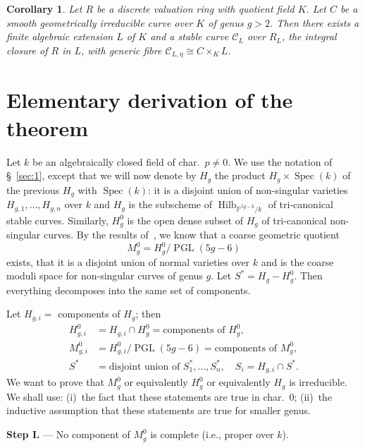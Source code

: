 \documentclass[10pt]{amsart}
\theoremstyle{plain}
\newtheorem{corollary}[theorem]{Corollary}
\theoremstyle{definition}
\DeclareMathOperator{\Spec}{Spec}
\DeclareMathOperator{\PGL}{PGL}
\DeclareMathOperator{\Hilb}{Hilb}
\begin{document}
\begin{corollary}\label{cor:2.7}
Let $R$ be a discrete valuation ring with quotient field $K$. Let $C$ be a smooth geometrically irreducible curve over $K$ of genus $g > 2$. Then there exists a finite algebraic extension $L$ of $K$ and a stable curve $\mathscr{C}_L$ over $R_L$, the integral closure of $R$ in $L$, with generic fibre $\mathscr{C}_{L,\eta} \cong C \times_K L$.
\end{corollary}

\section{Elementary derivation of the theorem}\label{sec:3}

Let $k$ be an algebraically closed field of char.~$p \neq 0$. We use the notation of \S~\ref{sec:1}, except that we will now denote by $H_g$ the product $H_g \times \Spec(k)$ of the previous $H_g$ with $\Spec(k)$: it is a disjoint union of non-singular varieties $H_{g,1}, \ldots, H_{g,n}$ over $k$ and $H_g$ is the subscheme of $\Hilb_{\mathbb{P}^{5g-6}/k}$ of tri-canonical stable curves. Similarly, $H_g^0$ is the open dense subset of $H_g$ of tri-canonical non-singular curves. By the results of~\cite{M1}, we know that a coarse geometric quotient
\[
M_g^0 = H_g^0/\PGL(5g-6)
\]
exists, that it is a disjoint union of normal varieties over $k$ and is the coarse moduli space for non-singular curves of genus $g$. Let $S^* = H_g - H_g^0$. Then everything decomposes into the same set of components.

Let $H_{g,i} =$ components of $H_g$; then
\begin{align*}
H_{g,i}^0 &= H_{g,i} \cap H_g^0 = \text{components of } H_g^0, \\
M_{g,i}^0 &= H_{g,i}^0 / \PGL(5g-6) = \text{components of } M_g^0, \\
S^* &= \text{disjoint union of } S_1^*, \ldots, S_n^*, \quad S_i = H_{g,i} \cap S^*.
\end{align*}
We want to prove that $M_g^0$ or equivalently $H_g^0$ or equivalently $H_g$ is irreducible. We shall use: (i)~the fact that these statements are true in char.~$0$; (ii)~the inductive assumption that these statements are true for smaller genus.

\textbf{Step I.} --- No component of $M_g^0$ is complete (i.e., proper over $k$).
\end{document}
